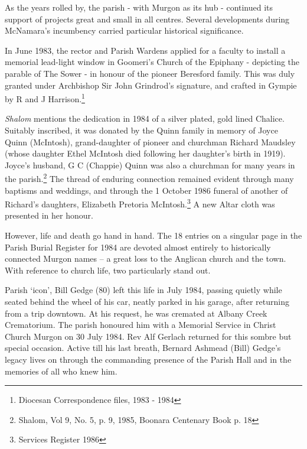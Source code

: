 As the years rolled by, the parish - with Murgon as its hub - continued its support of projects great and small in all centres. Several developments during McNamara's incumbency carried particular historical significance.



In June 1983, the rector and Parish Wardens applied for a faculty to install a memorial lead-light window in Goomeri's Church of the Epiphany - depicting the parable of The Sower - in honour of the pioneer Beresford family. This was duly granted under Archbishop Sir John Grindrod's signature, and crafted in Gympie by R and J Harrison.\footnote{Diocesan Correspondence files, 1983 - 1984}


\emph{Shalom} mentions the dedication in 1984 of a silver plated, gold lined Chalice. Suitably inscribed, it was donated by the Quinn family in memory of Joyce Quinn (McIntosh), grand-daughter of pioneer and churchman Richard Maudsley (whose daughter Ethel McIntosh died following her daughter's birth in 1919). Joyce's husband, G C (Chappie) Quinn was also a churchman for many years in the parish.\footnote{Shalom, Vol 9, No. 5, p. 9, 1985, Boonara Centenary Book p. 18} The thread of enduring connection remained evident through many baptisms and weddings, and through the 1 October 1986 funeral of another of Richard's daughters, Elizabeth Pretoria McIntosh.\footnote{Services Register 1986} A new Altar cloth was presented in her honour.


However, life and death go hand in hand. The 18 entries on a singular page in the Parish Burial Register for 1984 are devoted almost entirely to historically connected Murgon names -- a great loss to the Anglican church and the town. With reference to church life, two particularly stand out.



Parish `icon', Bill Gedge (80) left this life in July 1984, passing quietly while seated behind the wheel of his car, neatly parked in his garage, after returning from a trip downtown. At his request, he was cremated at Albany Creek Crematorium. The parish honoured him with a Memorial Service in Christ Church Murgon on 30 July 1984. Rev Alf Gerlach returned for this sombre but special occasion. Active till his last breath, Bernard Ashmead (Bill) Gedge's legacy lives on through the commanding presence of the Parish Hall and in the memories of all who knew him.



